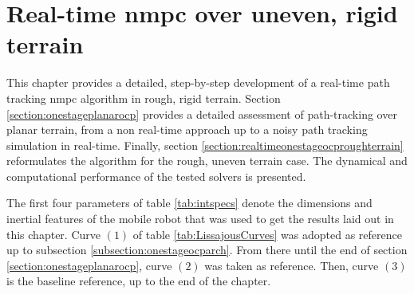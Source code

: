 
\chapter{Real-time \acrshort{nmpc} over uneven, rigid terrain}
\label{chapter:nmpc}

This chapter provides a detailed, step-by-step development of a real-time path tracking \acrshort{nmpc} algorithm in rough, rigid terrain. Section \ref{section:onestageplanarocp} provides a detailed assessment of path-tracking over planar terrain, from a non real-time approach up to a noisy path tracking simulation in real-time. Finally, section \ref{section:realtimeonestageocproughterrain} reformulates the algorithm for the rough, uneven terrain case. The dynamical and computational performance of the tested solvers is presented.

\begin{remark}
The first four parameters of table \ref{tab:intspecs} denote the dimensions and inertial features of the mobile robot that was used to get the results laid out in this chapter. Curve $(1)$ of table \ref{tab:LissajousCurves} was adopted as reference up to subsection \ref{subsection:onestageocparch}. From there until the end of section \ref{section:onestageplanarocp}, curve $(2)$ was taken as reference. Then, curve $(3)$ is the baseline reference, up to the end of the chapter.
\end{remark}


